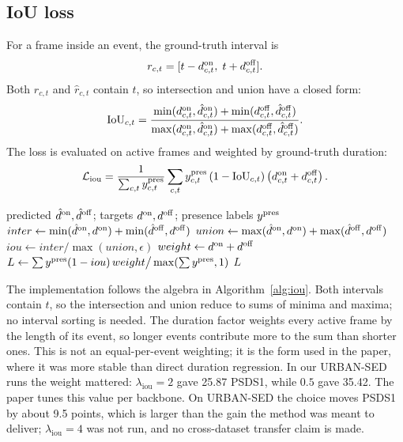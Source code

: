 \subsection{IoU loss}
For a frame inside an event, the ground-truth interval is
\begin{equation}
r_{c,t}
=
[t-d^{\mathrm{on}}_{c,t},\; t+d^{\mathrm{off}}_{c,t}].
\end{equation}
Both $r_{c,t}$ and $\hat r_{c,t}$ contain $t$, so intersection and union have a
closed form:
\begin{equation}
\mathrm{IoU}_{c,t}
=
\frac{
\min(d^{\mathrm{on}}_{c,t},\hat d^{\mathrm{on}}_{c,t})
+
\min(d^{\mathrm{off}}_{c,t},\hat d^{\mathrm{off}}_{c,t})
}{
\max(d^{\mathrm{on}}_{c,t},\hat d^{\mathrm{on}}_{c,t})
+
\max(d^{\mathrm{off}}_{c,t},\hat d^{\mathrm{off}}_{c,t})
}.
\end{equation}
The loss is evaluated on active frames and weighted by ground-truth duration:
\begin{equation}
\mathcal{L}_{\mathrm{iou}}
=
\frac{1}{\sum_{c,t} y^{\mathrm{pres}}_{c,t}}
\sum_{c,t}
y^{\mathrm{pres}}_{c,t}
\left(1-\mathrm{IoU}_{c,t}\right)
\left(d^{\mathrm{on}}_{c,t}+d^{\mathrm{off}}_{c,t}\right).
\end{equation}
\begin{algorithm}[t]
\caption{Duration-weighted IoU loss for one batch}
\label{alg:iou}
\begin{algorithmic}[1]
\Require predicted $\hat d^{\mathrm{on}},\hat d^{\mathrm{off}}$; targets $d^{\mathrm{on}},d^{\mathrm{off}}$;
         presence labels $y^{\mathrm{pres}}$
\State $inter \gets \min(\hat d^{\mathrm{on}},d^{\mathrm{on}})+\min(\hat d^{\mathrm{off}},d^{\mathrm{off}})$
\State $union \gets \max(\hat d^{\mathrm{on}},d^{\mathrm{on}})+\max(\hat d^{\mathrm{off}},d^{\mathrm{off}})$
\State $iou \gets inter / \max(union,\epsilon)$ 
\State $weight \gets d^{\mathrm{on}}+d^{\mathrm{off}}$
\State $L \gets \sum y^{\mathrm{pres}}(1-iou)\,weight
       \big/ \max(\sum y^{\mathrm{pres}},1)$
\State \Return $L$
\end{algorithmic}
\end{algorithm}

The implementation follows the algebra in Algorithm~\ref{alg:iou}. Both
intervals contain $t$, so the intersection and union reduce to sums of minima
and maxima; no interval sorting is needed. The duration factor weights every active frame by the length of its event, so
longer events contribute more to the sum than shorter ones. This is not an
equal-per-event weighting; it is the form used in the paper, where it was more
stable than direct duration regression. In our URBAN-SED runs the weight
mattered: $\lambda_{\mathrm{iou}}=2$ gave 25.87 PSDS1, while $0.5$ gave 35.42.
The paper tunes this value per backbone. On URBAN-SED the choice moves PSDS1 by
about 9.5 points, which is larger than the gain the method was meant to deliver;
$\lambda_{\mathrm{iou}}=4$ was not run, and no cross-dataset transfer claim is
made.
